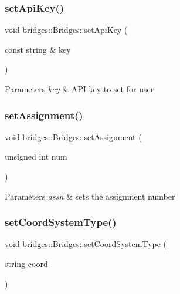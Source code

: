 \subsubsection{\texorpdfstring{set\+Api\+Key()}{setApiKey()}}
{\footnotesize\ttfamily void bridges\+::\+Bridges\+::set\+Api\+Key (\begin{DoxyParamCaption}\item[{const string \&}]{key }\end{DoxyParamCaption})\hspace{0.3cm}{\ttfamily [inline]}}


\begin{DoxyParams}{Parameters}
{\em key} & A\+PI key to set for user \\
\hline
\end{DoxyParams}
\mbox{\label{classbridges_1_1_bridges_aca7a68fb8cc0d1bec81656dfa77b1162}} 
\subsubsection{\texorpdfstring{set\+Assignment()}{setAssignment()}}
{\footnotesize\ttfamily void bridges\+::\+Bridges\+::set\+Assignment (\begin{DoxyParamCaption}\item[{unsigned int}]{num }\end{DoxyParamCaption})\hspace{0.3cm}{\ttfamily [inline]}}


\begin{DoxyParams}{Parameters}
{\em assn} & sets the assignment number \\
\hline
\end{DoxyParams}
\mbox{\label{classbridges_1_1_bridges_ad00c07d3a028110424909081a94c4013}} 
\subsubsection{\texorpdfstring{set\+Coord\+System\+Type()}{setCoordSystemType()}}
{\footnotesize\ttfamily void bridges\+::\+Bridges\+::set\+Coord\+System\+Type (\begin{DoxyParamCaption}\item[{string}]{coord }\end{DoxyParamCaption})\hspace{0.3cm}{\ttfamily [inline]}}

